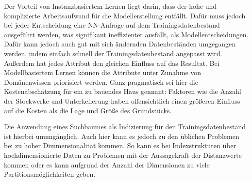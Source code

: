Der Vorteil von Instanzbasiertem Lernen liegt darin, dass der hohe und komplizierte
Arbeitsaufwand für die Modellerstellung entfällt. Dafür muss jedoch bei jeder
Entscheidung eine NN-Anfrage auf dem Trainingsdatenbestand ausgeführt werden, was
signifikant ineffizienter ausfällt, als Modellentscheidungen. Dafür kann jedoch auch
gut mit sich ändernden Datenbeständen umgegangen werden, indem einfach schnell der
Trainingsdatenbestand angepasst wird. Außerdem hat jedes Attribut den gleichen Einfluss
auf das Resultat. Bei Modellbasiertem Lernen können die Attribute unter Zunahme
von Domänenwissen priorisiert werden. Ganz pragmatisch sei hier die Kostenabschätzung
für ein zu bauendes Haus gennant: Faktoren wie die Anzahl der Stockwerke und 
Unterkellerung haben offensichtlich einen größeren Einfluss auf die Kosten als
die Lage und Größe des Grundstücks.

Die Anwendung eines Suchbaumes als Indizierung für den Trainingsdatenbestand ist
hierbei unumgänglich. Auch hier kann es jedoch zu den üblichen Problemen bei zu
hoher Dimmensionalität kommen. So kann es bei Indexstrukturen über hochdimensionierte
Daten zu Problemen mit der Aussagekraft der Distanzwerte kommen oder es kann aufgrund
der Anzahl der Dimensionen zu viele Partitionsmöglichkeiten geben.

